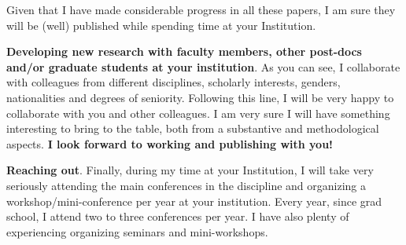 \documentclass[10pt,stdletter,dateno,sigleft]{newlfm} %
\begin{document}
\begin{newlfm}
\begin{enumerate}
\end{enumerate}


Given that I have made considerable progress in all these papers, I am sure they will be (well) published while spending time at your Institution.

{\bf Developing new research with faculty members, other post-docs and/or graduate students at your institution}. As you can see, I collaborate with colleagues from different disciplines, scholarly interests, genders, nationalities and degrees of seniority. Following this line, I will be very happy to collaborate with you and other colleagues. I am very sure I will have something interesting to bring to the table, both from a substantive and methodological aspects. {\bf I look forward to working and publishing with you!}

{\bf Reaching out}. Finally, during my time at your Institution, I will take very seriously attending the main conferences in the discipline and organizing a workshop/mini-conference per year at your institution. Every year, since grad school, I attend two to three conferences per year. I have also plenty of experiencing organizing seminars and mini-workshops. 

{\unskip}


\vspace{-10cm}



\end{newlfm}
\end{document}
